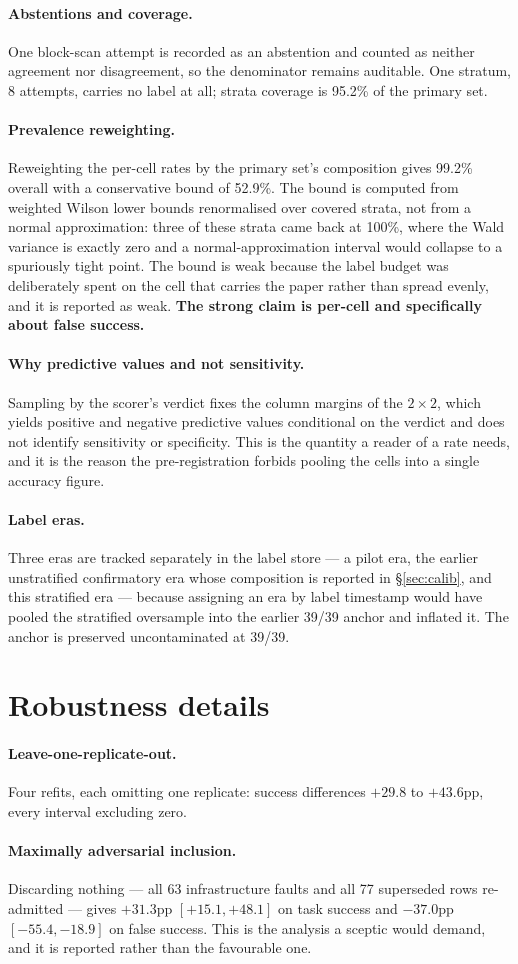 \documentclass[11pt]{article}
\newcommand{\runin}[1]{\paragraph{#1}}
\begin{document}
\runin{Abstentions and coverage.}
One block-scan attempt is recorded as an abstention and counted as
neither agreement nor disagreement, so the denominator remains
auditable. One stratum, 8 attempts, carries no label at all; strata
coverage is 95.2\% of the primary set.

\runin{Prevalence reweighting.}
Reweighting the per-cell rates by the primary set's composition gives
99.2\% overall with a conservative bound of 52.9\%. The bound is
computed from weighted Wilson lower bounds renormalised over covered
strata, not from a normal approximation: three of these strata came back
at 100\%, where the Wald variance is exactly zero and a
normal-approximation interval would collapse to a spuriously tight
point. The bound is weak because the label budget was deliberately spent
on the cell that carries the paper rather than spread evenly, and it is
reported as weak. \textbf{The strong claim is per-cell and specifically
about false success.}

\runin{Why predictive values and not sensitivity.}
Sampling by the scorer's verdict fixes the column margins of the
$2 \times 2$, which yields positive and negative predictive values
conditional on the verdict and does not identify sensitivity or
specificity. This is the quantity a reader of a rate needs, and it is
the reason the pre-registration forbids pooling the cells into a single
accuracy figure.

\runin{Label eras.}
Three eras are tracked separately in the label store --- a pilot era,
the earlier unstratified confirmatory era whose composition is reported
in \S\ref{sec:calib}, and this stratified era --- because assigning an
era by label timestamp would have pooled the stratified oversample into
the earlier 39/39 anchor and inflated it. The anchor is preserved
uncontaminated at 39/39.

\section{Robustness details}
\label{app:robust}

\runin{Leave-one-replicate-out.}
Four refits, each omitting one replicate: success differences $+29.8$ to
$+43.6$pp, every interval excluding zero.

\runin{Maximally adversarial inclusion.}
Discarding nothing --- all 63 infrastructure faults and all 77
superseded rows re-admitted --- gives $+31.3$pp $[+15.1, +48.1]$ on task
success and $-37.0$pp $[-55.4, -18.9]$ on false success. This is the
analysis a sceptic would demand, and it is reported rather than the
favourable one.
\end{document}
